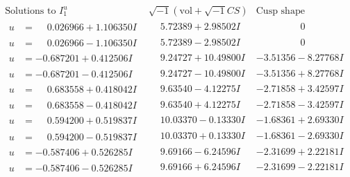 \documentclass[1p]{elsarticle_modified}
\theoremstyle{definition}
\newcommand{\I}{\sqrt{-1}}
\begin{document}
$$\begin{array}{c|c|c}  
\text{Solutions to }I^u_{1}& \I (\text{vol} + \sqrt{-1}CS) & \text{Cusp shape}\\
 \hline 
\begin{aligned}
u &= \phantom{-}0.026966 + 1.106350 I\end{aligned}
 & \phantom{-}5.72389 + 2.98502 I & \phantom{-0.000000 } 0 \\ \hline\begin{aligned}
u &= \phantom{-}0.026966 - 1.106350 I\end{aligned}
 & \phantom{-}5.72389 - 2.98502 I & \phantom{-0.000000 } 0 \\ \hline\begin{aligned}
u &= -0.687201 + 0.412506 I\end{aligned}
 & \phantom{-}9.24727 + 10.49800 I & -3.51356 - 8.27768 I \\ \hline\begin{aligned}
u &= -0.687201 - 0.412506 I\end{aligned}
 & \phantom{-}9.24727 - 10.49800 I & -3.51356 + 8.27768 I \\ \hline\begin{aligned}
u &= \phantom{-}0.683558 + 0.418042 I\end{aligned}
 & \phantom{-}9.63540 - 4.12275 I & -2.71858 + 3.42597 I \\ \hline\begin{aligned}
u &= \phantom{-}0.683558 - 0.418042 I\end{aligned}
 & \phantom{-}9.63540 + 4.12275 I & -2.71858 - 3.42597 I \\ \hline\begin{aligned}
u &= \phantom{-}0.594200 + 0.519837 I\end{aligned}
 & \phantom{-}10.03370 - 0.13330 I & -1.68361 + 2.69330 I \\ \hline\begin{aligned}
u &= \phantom{-}0.594200 - 0.519837 I\end{aligned}
 & \phantom{-}10.03370 + 0.13330 I & -1.68361 - 2.69330 I \\ \hline\begin{aligned}
u &= -0.587406 + 0.526285 I\end{aligned}
 & \phantom{-}9.69166 - 6.24596 I & -2.31699 + 2.22181 I \\ \hline\begin{aligned}
u &= -0.587406 - 0.526285 I\end{aligned}
 & \phantom{-}9.69166 + 6.24596 I & -2.31699 - 2.22181 I \\ \hline\begin{aligned}

\end{aligned}
\end{array}$$
\end{document}
